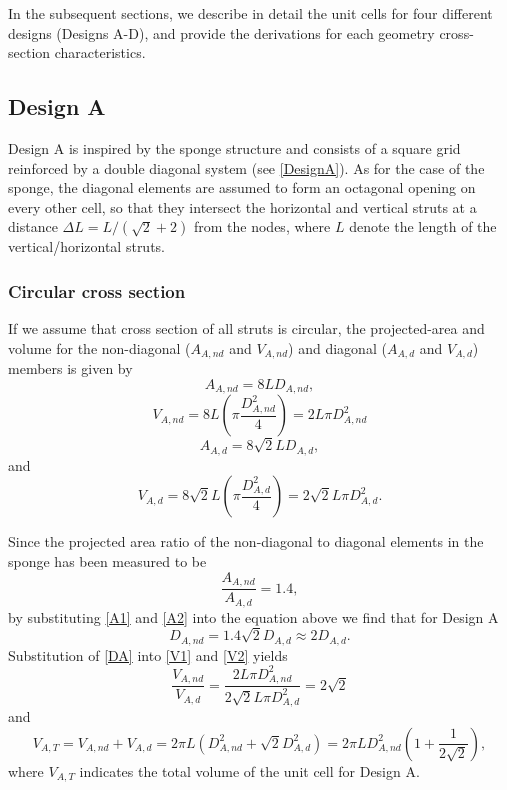 \documentclass[10pt,twoside]{fernandes_supp}
\begin{document}
In the subsequent sections, we describe in detail the unit cells for four different designs (Designs A-D), and provide the derivations for each geometry cross-section characteristics. 

\subsection{Design A}
Design A is inspired by the sponge structure and consists of a square grid  reinforced by a double diagonal system (see \cref{DesignA}). As for the case of the sponge, the diagonal elements are assumed to form an octagonal opening on every other cell, so that they  intersect the horizontal and vertical struts at a distance $\Delta L=L/(\sqrt{2}+2)$ from the nodes, where $L$ denote the length of the vertical/horizontal struts. 
\subsubsection{Circular cross section} 
If we assume that cross section of all struts is circular, the projected-area and volume for the non-diagonal ($A_{A,nd}$ and $V_{A,nd}$) and diagonal ($A_{A,d}$ and $V_{A,d}$) members is given by
\begin{equation}\label{A1}
A_{A,nd}=8 L D_{A,nd},
\end{equation}
\begin{equation}\label{V1}
V_{A,nd}=8 L \left(\pi\frac{D^2_{A,nd}}{4}\right)=2 L \pi D^2_{A,nd}
\end{equation}
\begin{equation}\label{A2}
A_{A,d}=8\sqrt{2} L D_{A,d},
\end{equation}
and
\begin{equation}\label{V2}
V_{A,d}=8 \sqrt{2} L\left(\pi\frac{D^2_{A,d}}{4}\right)=2\sqrt{2}L \pi D^2_{A,d}.
\end{equation}

 Since the projected area ratio of the non-diagonal to diagonal elements in the sponge has been measured to be 
\begin{equation}
\frac{A_{A,nd}}{A_{A,d}}=1.4,
\end{equation}
by substituting \cref{A1} and \cref{A2} into the equation above we find that for Design A
\begin{equation} \label{DA}
D_{A,nd}=1.4\sqrt{2}D_{A,d}\approx 2 D_{A,d}.
\end{equation}
Substitution of \cref{DA} into \cref{V1} and \cref{V2} yields 
\begin{equation}
\frac{V_{A,nd}}{V_{A,d}}=\frac{2 L \pi D^2_{A,nd}}{2\sqrt{2}L \pi D^2_{A,d}}=2\sqrt{2}
\end{equation}
and
\begin{equation}\label{VT}
V_{A,T}=V_{A,nd}+V_{A,d}=2\pi L (D_{A,nd}^2+\sqrt{2} D_{A,d}^2)=2\pi L D_{A,nd}^2 \left(1+\frac{1}{2\sqrt{2}}\right),
\end{equation}
where $V_{A,T}$ indicates the total volume of the unit cell for Design A. 
\end{document}
